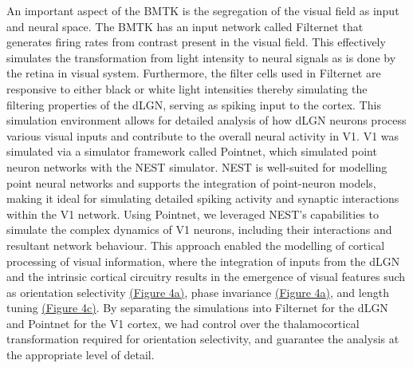 \documentclass[12pt]{article}
\begin{document}
An important aspect of the BMTK is the segregation of the visual field as input and neural space. The BMTK has an input network called Filternet that generates firing rates from contrast present in the visual field. This effectively simulates the transformation from light intensity to neural signals as is done by the retina in visual system. Furthermore, the filter cells used in Filternet are responsive to either black or white light intensities thereby simulating the filtering properties of the dLGN, serving as spiking input to the cortex. This simulation environment allows for detailed analysis of how dLGN neurons process various visual inputs and contribute to the overall neural activity in V1. V1 was simulated via a simulator framework called Pointnet, which simulated point neuron networks with the NEST simulator. NEST is well-suited for modelling point neural networks and supports the integration of point-neuron models, making it ideal for simulating detailed spiking activity and synaptic interactions within the V1 network. Using Pointnet, we leveraged NEST's capabilities to simulate the complex dynamics of V1 neurons, including their interactions and resultant network behaviour. This approach enabled the modelling of cortical processing of visual information, where the integration of inputs from the dLGN and the intrinsic cortical circuitry results in the emergence of visual features such as orientation selectivity \hyperref[fig:LIF_Overview]{(Figure 4a)}, phase invariance \hyperref[fig:LIF_Overview]{(Figure 4a)}, and length tuning \hyperref[fig:LIF_Overview]{(Figure 4c)}. By separating the simulations into Filternet for the dLGN and Pointnet for the V1 cortex, we had control over the thalamocortical transformation required for orientation selectivity, and guarantee the analysis at the appropriate level of detail.
\bigbreak
\end{document}

